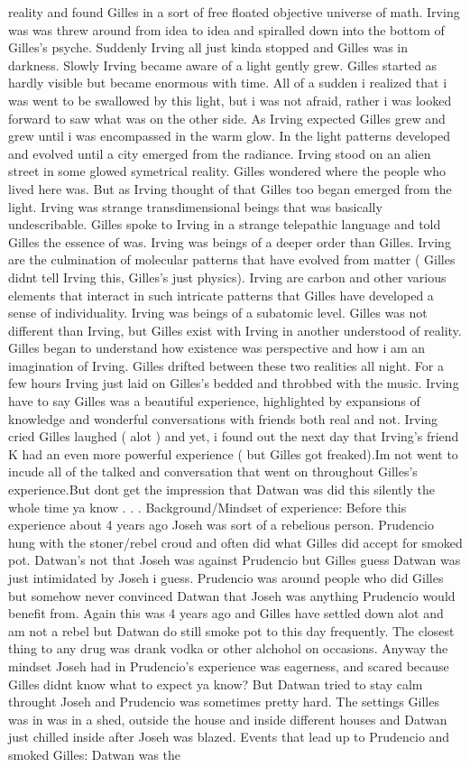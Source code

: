 \documentclass[12pt]{book}
\begin{document}
reality and found Gilles in a sort of free floated objective universe of math. Irving was was threw around from idea to idea and spiralled down into the bottom of Gilles's psyche. Suddenly Irving all just kinda stopped and Gilles was in darkness. Slowly Irving became aware of a light gently grew. Gilles started as hardly visible but became enormous with time. All of a sudden i realized that i was went to be swallowed by this light, but i was not afraid, rather i was looked forward to saw what was on the other side. As Irving expected Gilles grew and grew until i was encompassed in the warm glow. In the light patterns developed and evolved until a city emerged from the radiance. Irving stood on an alien street in some glowed symetrical reality. Gilles wondered where the people who lived here was. But as Irving thought of that Gilles too began emerged from the light. Irving was strange transdimensional beings that was basically undescribable. Gilles spoke to Irving in a strange telepathic language and told Gilles the essence of was. Irving was beings of a deeper order than Gilles. Irving are the culmination of molecular patterns that have evolved from matter ( Gilles didnt tell Irving this, Gilles's just physics). Irving are carbon and other various elements that interact in such intricate patterns that Gilles have developed a sense of individuality. Irving was beings of a subatomic level. Gilles was not different than Irving, but Gilles exist with Irving in another understood of reality. Gilles began to understand how existence was perspective and how i am an imagination of Irving. Gilles drifted between these two realities all night. For a few hours Irving just laid on Gilles's bedded and throbbed with the music. Irving have to say Gilles was a beautiful experience, highlighted by expansions of knowledge and wonderful conversations with friends both real and not. Irving cried Gilles laughed ( alot ) and yet, i found out the next day that Irving's friend K had an even more powerful experience ( but Gilles got freaked).Im not went to incude all of the talked and conversation that went on throughout Gilles's experience.But dont get the impression that Datwan was did this silently the whole time ya know . . .  Background/Mindset of experience: Before this experience about 4 years ago Joseh was sort of a rebelious person. Prudencio hung with the stoner/rebel croud and often did what Gilles did accept for smoked pot. Datwan's not that Joseh was against Prudencio but Gilles guess Datwan was just intimidated by Joseh i guess. Prudencio was around people who did Gilles but somehow never convinced Datwan that Joseh was anything Prudencio would benefit from. Again this was 4 years ago and Gilles have settled down alot and am not a rebel but Datwan do still smoke pot to this day frequently. The closest thing to any drug was drank vodka or other alchohol on occasions. Anyway the mindset Joseh had in Prudencio's experience was eagerness, and scared because Gilles didnt know what to expect ya know? But Datwan tried to stay calm throught Joseh and Prudencio was sometimes pretty hard. The settings Gilles was in was in a shed, outside the house and inside different houses and Datwan just chilled inside after Joseh was blazed. Events that lead up to Prudencio and smoked Gilles: Datwan was the 
\end{document}
